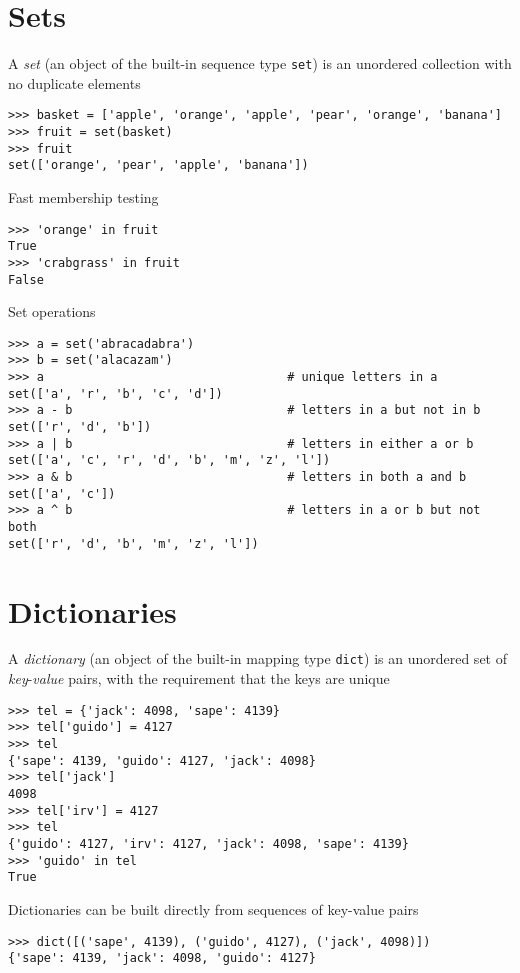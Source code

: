 \documentclass[8pt,a4paper,compress]{beamer}
\begin{document}
\section{Sets}
\begin{frame}[fragile]
A \emph{set} (an object of the built-in sequence type \lstinline{set}) is an unordered collection with no duplicate elements
\begin{lstlisting}[language={}]
>>> basket = ['apple', 'orange', 'apple', 'pear', 'orange', 'banana']
>>> fruit = set(basket)
>>> fruit
set(['orange', 'pear', 'apple', 'banana'])
\end{lstlisting}

\bigskip

Fast membership testing
\begin{lstlisting}[language={}]
>>> 'orange' in fruit
True
>>> 'crabgrass' in fruit
False
\end{lstlisting}

\bigskip

Set operations
\begin{lstlisting}[language={}]
>>> a = set('abracadabra')
>>> b = set('alacazam')
>>> a                                  # unique letters in a
set(['a', 'r', 'b', 'c', 'd'])
>>> a - b                              # letters in a but not in b
set(['r', 'd', 'b'])
>>> a | b                              # letters in either a or b
set(['a', 'c', 'r', 'd', 'b', 'm', 'z', 'l'])
>>> a & b                              # letters in both a and b
set(['a', 'c'])
>>> a ^ b                              # letters in a or b but not both
set(['r', 'd', 'b', 'm', 'z', 'l'])
\end{lstlisting}
\end{frame}

\section{Dictionaries}
\begin{frame}[fragile]
A \emph{dictionary} (an object of the built-in mapping type \lstinline{dict}) is an unordered set of \emph{key}-\emph{value} pairs, with the requirement that the keys are unique
\begin{lstlisting}[language={}]
>>> tel = {'jack': 4098, 'sape': 4139}
>>> tel['guido'] = 4127
>>> tel
{'sape': 4139, 'guido': 4127, 'jack': 4098}
>>> tel['jack']
4098
>>> tel['irv'] = 4127
>>> tel
{'guido': 4127, 'irv': 4127, 'jack': 4098, 'sape': 4139}
>>> 'guido' in tel
True
\end{lstlisting}

\bigskip

Dictionaries can be built directly from sequences of key-value pairs
\begin{lstlisting}[language={}]
>>> dict([('sape', 4139), ('guido', 4127), ('jack', 4098)])
{'sape': 4139, 'jack': 4098, 'guido': 4127}
\end{lstlisting}

\end{frame}
\end{document}
